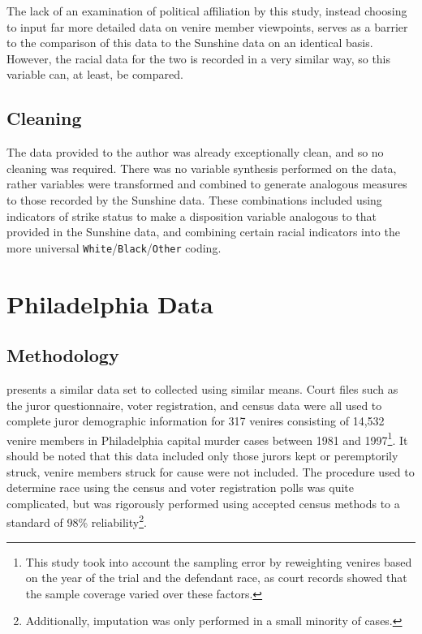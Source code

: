 The lack of an examination of political affiliation by this study, instead choosing to input far more detailed data on venire
member viewpoints, serves as a barrier to the comparison of this data to the Sunshine data on an identical basis. However, the
racial data for the two is recorded in a very similar way, so this variable can, at least, be compared.

\subsection{Cleaning}

The data provided to the author was already exceptionally clean, and so no cleaning was required. There was no variable synthesis
performed on the data, rather variables were transformed and combined to generate analogous measures to those recorded by the Sunshine
data. These combinations included using indicators of strike status to make a disposition variable analogous to that provided in
the Sunshine data, and combining certain racial indicators into the more universal \texttt{White}/\texttt{Black}/\texttt{Other} coding.

\section{Philadelphia Data} \label{sec:phillydata}

\subsection{Methodology}

\cite{PerempChalMurder} presents a similar data set to \cite{StubbornLegacy} collected using similar means. Court files such as
the juror questionnaire, voter registration, and census data were all used to complete juror demographic information for 317
venires consisting of 14,532 venire members in Philadelphia capital murder cases between 1981 and 1997\footnote{This study took
  into account the sampling error by reweighting venires based on the year of the trial and the defendant race, as court
  records showed that the sample coverage varied over these factors.}. It should be noted that this data included only those
jurors kept or peremptorily struck, venire members struck for cause were not included. The procedure used to determine
race using the census and voter registration polls was quite complicated, but was rigorously performed using accepted census
methods to a standard of 98\% reliability\footnote{Additionally, imputation was only performed in a small minority of cases.}.

